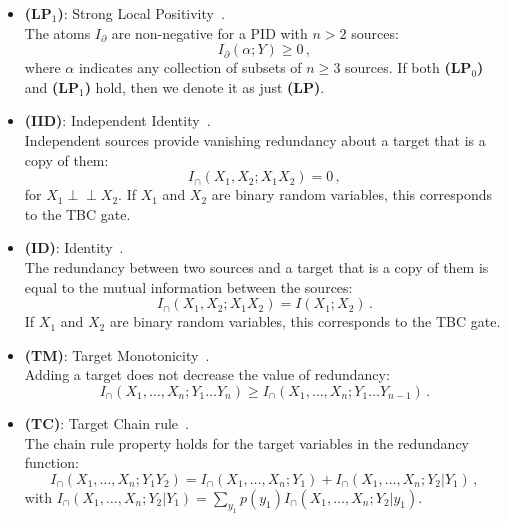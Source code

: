 \documentclass{article}
\newcommand{\ts}[1]{\ensuremath{_{\text{#1}}}}
\newcommand{\ind}{\mathrel{\perp\!\!\!\perp}}
\newcommand{\Xs}{X_1,\ldots,X_n}
\newcommand{\LPz}{\textbf{(LP\ts{0})}\xspace} %
\newcommand{\LPo}{\textbf{(LP\ts{1})}\xspace} %
\newcommand{\LP}{\textbf{(LP)}\xspace}
\begin{document}
\begin{itemize}
    \item \textbf{(LP\ts{1})}: Strong Local Positivity~\cite{williams2010nonnegative}. \\
    The atoms $I_\partial$ are non-negative for a PID with $n>2$ sources:
    \begin{equation}\label{ax:LP1}
        I_\partial(\alpha;Y)\ge0 \,,
    \end{equation}
    where $\alpha$ indicates any collection of subsets of $n\ge3$ sources. If both \LPz and \LPo hold, then we denote it as just \LP.

    \item \textbf{(IID)}: Independent Identity~\cite{ince2017measuring}. \\
    Independent sources provide vanishing redundancy about a target that is a copy of them:
    \begin{equation}\label{ax:IID}
        I_\cap(X_1,X_2;X_1X_2)=0 \,,
    \end{equation}
    for $X_1\ind X_2$. If $X_1$ and $X_2$ are binary random variables, this corresponds to the TBC gate.

    \item \textbf{(ID)}: Identity~\cite{harder2013bivariate}. \\
    The redundancy between two sources and a target that is a copy of them is equal to the mutual information between the sources:
    \begin{equation}\label{ax:ID}
        I_\cap(X_1,X_2;X_1X_2)=I(X_1;X_2) \,.
    \end{equation}
    If $X_1$ and $X_2$ are binary random variables, this corresponds to the TBC gate.

    \item \textbf{(TM)}: Target Monotonicity~\cite{bertschinger2013shared}. \\
    Adding a target does not decrease the value of redundancy:
    \begin{equation}\label{ax:TM}
        I_\cap(\Xs;Y_1\ldots Y_n)\ge I_\cap(\Xs;Y_1\ldots Y_{n-1}) \,.
    \end{equation}

    \item \textbf{(TC)}: Target Chain rule~\cite{bertschinger2013shared}. \\
    The chain rule property holds for the target variables in the redundancy function:
    \begin{equation}\label{ax:TC}
        I_\cap(\Xs;Y_1Y_2) = I_\cap(\Xs;Y_1) + I_\cap(\Xs;Y_2 | Y_1) \,,
    \end{equation}
    with $I_\cap(\Xs;Y_2 | Y_1) = \sum_{y_1}p(y_1)I_\cap(\Xs;Y_2 | y_1)$.


\end{itemize}
\end{document}
